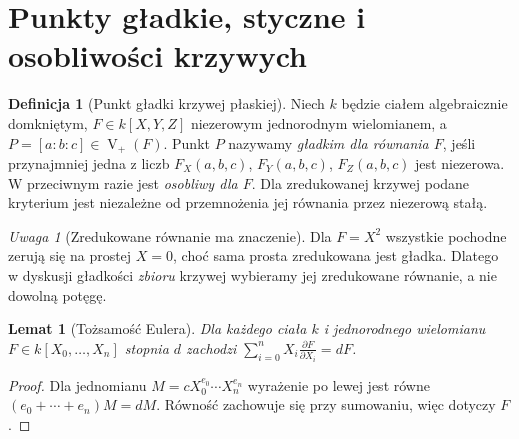 \documentclass[11pt,a4paper,openany]{report}
\numberwithin{equation}{section}
\theoremstyle{plain}
\newtheorem{lemat}[twierdzenie]{Lemat}
\theoremstyle{definition}
\newtheorem{definicja}[twierdzenie]{Definicja}
\theoremstyle{remark}
\newtheorem{uwaga}[twierdzenie]{Uwaga}
\newcommand{\V}{\operatorname V}
\begin{document}
\section{Punkty gładkie, styczne i osobliwości krzywych}

\begin{definicja}[Punkt gładki krzywej płaskiej]
Niech $k$ będzie ciałem algebraicznie domkniętym,
$F\in k[X,Y,Z]$ niezerowym jednorodnym wielomianem,
a $P=[a:b:c]\in\V_+(F)$. Punkt $P$ nazywamy
\emph{gładkim dla równania $F$}, jeśli przynajmniej jedna
z liczb $F_X(a,b,c)$, $F_Y(a,b,c)$, $F_Z(a,b,c)$ jest
niezerowa. W przeciwnym razie jest \emph{osobliwy dla $F$}.
Dla zredukowanej krzywej podane kryterium jest niezależne
od przemnożenia jej równania przez niezerową stałą.
\end{definicja}

\begin{uwaga}[Zredukowane równanie ma znaczenie]
Dla $F=X^2$ wszystkie pochodne zerują się na prostej $X=0$,
choć sama prosta zredukowana jest gładka.
Dlatego w dyskusji gładkości \emph{zbioru} krzywej wybieramy
jej zredukowane równanie, a nie dowolną potęgę.
\end{uwaga}

\begin{lemat}[Tożsamość Eulera]
Dla każdego ciała $k$ i jednorodnego wielomianu
$F\in k[X_0,\dots,X_n]$ stopnia $d$ zachodzi
$\sum_{i=0}^nX_i\frac{\partial F}{\partial X_i}=dF$.
\end{lemat}
\begin{proof}
Dla jednomianu $M=cX_0^{e_0}\cdots X_n^{e_n}$
wyrażenie po lewej jest równe
$(e_0+\cdots+e_n)M=dM$.
Równość zachowuje się przy sumowaniu, więc dotyczy $F$.
\end{proof}
\end{document}
